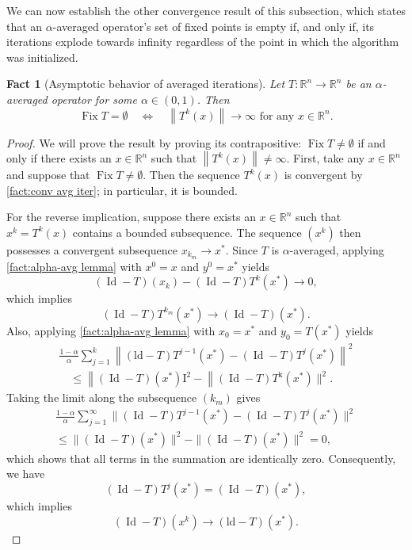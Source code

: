 \documentclass[smallextended,numbook,nospthms]{svjour3}
\theoremstyle{plain}
\newtheorem{fact}[theorem]{Fact}
\theoremstyle{definition}
\def\RR{\mathds R}
\DeclareMathOperator{\Id}{Id}
\DeclareMathOperator{\Fix}{Fix}
\begin{document}
We can now establish the other convergence result of this subsection, which states that an $\alpha$-averaged operator's set of fixed points is empty if, and only if, its iterations explode towards infinity regardless of the point in which the algorithm was initialized.
\begin{fact}[Asymptotic behavior of averaged iterations]\label{fact:asymp behav avg iter} Let $T: \RR^n \rightarrow \RR^n$ be an $\alpha$-averaged operator for some $\alpha \in (0,1)$. Then
\[
\operatorname{Fix} T=\emptyset \quad \Leftrightarrow \quad\left\|T^{k}(x)\right\| \rightarrow \infty \text { for any } x \in \RR^n.
\]
\end{fact}
\begin{proof}
	
We will prove the result by proving its contrapositive: $\Fix T \neq \emptyset$ if and only if there exists an $x \in \RR^n$ such that $\left\|T^{k}(x)\right\| \neq \infty$.
First, take any $x \in \RR^n$ and suppose that $\Fix T \neq \emptyset$. Then the sequence $T^{k}(x)$ is convergent by \cref{fact:conv avg iter}; in particular, it is bounded.

For the reverse implication, suppose there exists an $x \in \RR^n$ such that $x^{k}=T^{k}(x)$ contains a bounded subsequence. The sequence $\left(x^{k}\right)$ then possesses a convergent subsequence $x_{k_{m}} \rightarrow x^{*}$. Since $T$ is $\alpha$-averaged, applying \cref{fact:alpha-avg lemma} with $x^{0}=x$ and $y^{0}=x^{*}$ yields
\[
(\Id-T)\left(x_{k}\right)-(\Id-T) T^{k}\left(x^{*}\right) \rightarrow 0,
\]
which implies
\[
(\Id-T) T^{k_{m}}\left(x^{*}\right) \rightarrow(\Id-T)\left(x^{*}\right).
\]
Also, applying \cref{fact:alpha-avg lemma} with $x_{0}=x^{*}$ and $y_{0}=T\left(x^{*}\right)$ yields
\begin{align}
	\frac{1-\alpha}{\alpha} \sum_{j=1}^{k}\left\|(\mathrm{ld}-T) T^{j-1}\left(x^{*}\right)-(\Id-T) T^{j}\left(x^{*}\right)\right\|^{2} \\
	\quad \leq\left\|(\Id-T)\left(x^{*}\right) \mathrm{I}^{2}-\right\|(\Id-T) T^{\mathrm{k}}\left(x^{*}\right) \|^{2}.
\end{align}
Taking the limit along the subsequence $\left(k_{m}\right)$ gives
\begin{align}
\frac{1-\alpha}{\alpha} \sum_{j=1}^{\infty} \|(\Id-T) T^{j-1}(x^{*})-(\Id-T) T^{j}(x^{*})\|^{2} \\
\leq \|(\Id-T)(x^{*})\|^{2}-\|(\Id-T)(x^{*})\|^{2}=0,
\end{align}
which shows that all terms in the summation are identically zero. Consequently, we have
\[
(\Id-T) T^{j}\left(x^{*}\right)=(\Id-T)\left(x^{*}\right),
\]
which implies
\[
(\Id-T)\left(x^{k}\right) \rightarrow(\mathrm{ld}-T)\left(x^{*}\right).
\]


\end{proof}
\end{document}
